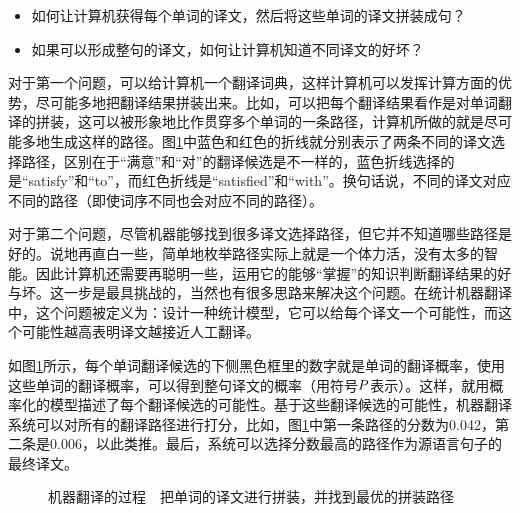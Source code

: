 \begin{itemize}
\vspace{0.5em}
\item 如何让计算机获得每个单词的译文，然后将这些单词的译文拼装成句？
\vspace{0.5em}
\item 如果可以形成整句的译文，如何让计算机知道不同译文的好坏？
\vspace{0.5em}
\end{itemize}

\parinterval 对于第一个问题，可以给计算机一个翻译词典，这样计算机可以发挥计算方面的优势，尽可能多地把翻译结果拼装出来。比如，可以把每个翻译结果看作是对单词翻译的拼装，这可以被形象地比作贯穿多个单词的一条路径，计算机所做的就是尽可能多地生成这样的路径。图\ref{fig:5-4}中蓝色和红色的折线就分别表示了两条不同的译文选择路径，区别在于“满意”和“对”的翻译候选是不一样的，蓝色折线选择的是“satisfy”和“to”，而红色折线是“satisfied”和“with”。换句话说，不同的译文对应不同的路径（即使词序不同也会对应不同的路径）。

\parinterval 对于第二个问题，尽管机器能够找到很多译文选择路径，但它并不知道哪些路径是好的。说地再直白一些，简单地枚举路径实际上就是一个体力活，没有太多的智能。因此计算机还需要再聪明一些，运用它的能够“掌握”的知识判断翻译结果的好与坏。这一步是最具挑战的，当然也有很多思路来解决这个问题。在统计机器翻译中，这个问题被定义为：设计一种统计模型，它可以给每个译文一个可能性，而这个可能性越高表明译文越接近人工翻译。

\parinterval 如图\ref{fig:5-4}所示，每个单词翻译候选的下侧黑色框里的数字就是单词的翻译概率，使用这些单词的翻译概率，可以得到整句译文的概率（用符号${P}$表示）。这样，就用概率化的模型描述了每个翻译候选的可能性。基于这些翻译候选的可能性，机器翻译系统可以对所有的翻译路径进行打分，比如，图\ref{fig:5-4}中第一条路径的分数为0.042，第二条是0.006，以此类推。最后，系统可以选择分数最高的路径作为源语言句子的最终译文。

\begin{figure}[htp]
    \centering

    \caption{机器翻译的过程\ \dash \ 把单词的译文进行拼装，并找到最优的拼装路径}
    \label{fig:5-4}
\end{figure}


